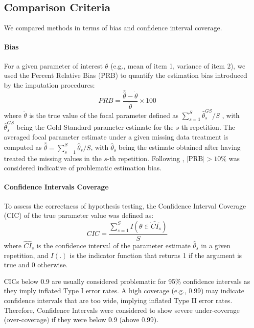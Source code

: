 \subsection{Comparison Criteria} \label{criteria}

	We compared methods in terms of bias and confidence interval coverage.

	\paragraph{Bias}

	For a given parameter of interest $\theta$ (e.g., mean of item 1, variance of item 2), we used the 
	Percent Relative Bias (PRB) to quantify the estimation bias introduced by the imputation procedures:
%
	\begin{equation} \label{eqn:prb}
		PRB = \frac{\bar{\hat{\theta}} - \dot{\theta}}{\dot{\theta}} \times 100
	\end{equation}
%
	where $\dot{\theta}$ is the true value of the focal parameter defined as 
	$\sum_{s=1}^{S} \hat{\theta}_{s}^{GS}/S$
	, with
	$\hat{\theta}_{s}^{GS}$ 
	being the Gold Standard parameter estimate for the $s$-th repetition. 
	The averaged focal parameter estimate under a given missing data treatment is computed as 
	$\bar{\hat{\theta}} = \sum_{s=1}^{S} \hat{\theta}_{s}/S$,
	with
	$\hat{\theta}_{s}$ being the estimate obtained after having treated the missing values in the 
	$s$-th repetition.
	Following \cite{muthenEtAl:1987}, $|\text{PRB}| > 10\%$ was considered indicative of problematic 
	estimation bias.

	\paragraph{Confidence Intervals Coverage}
	To assess the correctness of hypothesis testing, the Confidence Interval Coverage (CIC) of the true parameter
	value was defined as:
%
	\begin{equation} \label{eqn:cic}
		CIC =  \frac{ \sum_{s=1}^{S} I(\dot{\theta} \in \widehat{CI}_s ) }{S}
	\end{equation}
%
	where $\widehat{CI}_s$ is the confidence interval of the parameter estimate $\hat{\theta}_{s}$ in a given repetition, 
	and $I(.)$ is the indicator function that returns 1 if the argument is true and 0 otherwise.
	
	CICs below 0.9 are usually considered problematic for 95\% confidence intervals \cite[p. 52]{vanBuuren:2018} 
	as they imply inflated Type I error rates.
	A high coverage (e.g., 0.99) may indicate confidence intervals that are too wide, implying inflated Type II error rates.
	Therefore, Confidence Intervals were considered to show severe under-coverage (over-coverage) if they were 
	below 0.9 (above 0.99).

